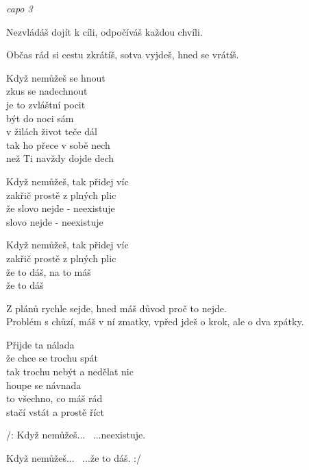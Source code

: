 
\re{}
\textit{capo 3}

\ve{}
Nezvládáš dojít k cíli, odpočíváš každou chvíli.

Občas rád si cestu zkrátíš, sotva vyjdeš, hned se vrátíš.

\cho{}
Když nemůžeš se hnout\\
zkus se nadechnout\\
je to zvláštní pocit\\
být do noci sám\\
v žilách život teče dál\\
tak ho přece v sobě nech\\
než Ti navždy dojde dech

Když nemůžeš, tak přidej víc\\
zakřič prostě z plných plic\\
že slovo nejde - neexistuje\\
slovo nejde - neexistuje

Když nemůžeš, tak přidej víc\\
zakřič prostě z plných plic\\
že to dáš, na to máš\\
že to dáš

\ve{}
Z plánů rychle sejde, hned máš důvod proč to nejde.\\
Problém s chůzí, máš v ní zmatky, vpřed jdeš o krok, ale o dva zpátky.

\cho{}

\cho{}
Přijde ta nálada\\
že chce se trochu spát\\
tak trochu nebýt a nedělat nic\\
houpe se návnada\\
to všechno, co máš rád\\
stačí vstát a prostě říct

/: Když nemůžeš... \ ...neexistuje.

Když nemůžeš... \ ...že to dáš. :/

\esong{}